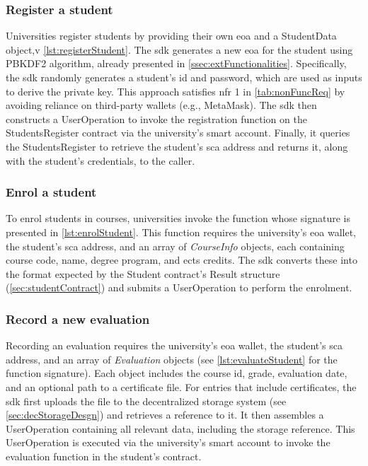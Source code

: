 \subsubsection{Register a student}
Universities register students by providing their own \gls{eoa} and a StudentData object,v \cref{lst:registerStudent}. The \gls{sdk} generates a new \gls{eoa} for the student using PBKDF2 algorithm, already presented in \cref{ssec:extFunctionalities}. Specifically, the \gls{sdk} randomly generates a student's \gls{id} and password, which are used as inputs to derive the private key. This approach satisfies \gls{nfr} 1 in \cref{tab:nonFuncReq} by avoiding reliance on third-party wallets (e.g., MetaMask). The \gls{sdk} then constructs a UserOperation to invoke the registration function on the StudentsRegister contract via the university's smart account. Finally, it queries the StudentsRegister to retrieve the student's \gls{sca} address and returns it, along with the student's credentials, to the caller.



\subsubsection{Enrol a student}
To enrol students in courses, universities invoke the function whose signature is presented in \cref{lst:enrolStudent}. This function requires the university's \gls{eoa} wallet, the student's \gls{sca} address, and an array of \textit{CourseInfo} objects, each containing course code, name, degree program, and \gls{ects} credits. The \gls{sdk} converts these into the format expected by the Student contract's Result structure (\cref{sec:studentContract}) and submits a UserOperation to perform the enrolment.



\subsubsection{Record a new evaluation}
Recording an evaluation requires the university’s \gls{eoa} wallet, the student’s \gls{sca} address, and an array of \textit{Evaluation} objects (see \cref{lst:evaluateStudent} for the function signature). Each object includes the course \gls{id}, grade, evaluation date, and an optional path to a certificate file. For entries that include certificates, the \gls{sdk} first uploads the file to the decentralized storage system (see \cref{sec:decStorageDesgn}) and retrieves a reference to it. It then assembles a UserOperation containing all relevant data, including the storage reference. This UserOperation is executed via the university's smart account to invoke the evaluation function in the student's contract.

